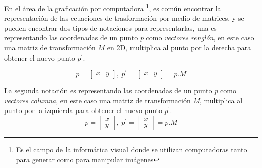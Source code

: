 En el área de la graficación por computadora \footnote{Es el campo de la informática visual donde se utilizan computadoras tanto para generar como para manipular imágenes}, es común encontrar la representación de las ecuaciones de trasformación por medio de matrices, y se pueden encontrar dos tipos de notaciones para representarlas, una es representando las coordenadas de un punto $p$ como \textit{vectores renglón}, en este caso una matriz de transformación $M$ en 2D, multiplica al punto por la derecha para obtener el nuevo punto $p^\prime$. \citep{Matias2007}

\begin{equation}
   p = \begin{bmatrix}
       x & y         
     \end{bmatrix}, \ p^{\prime} = \begin{bmatrix}
       x & y         
     \end{bmatrix}= p.M  
\end{equation} 
     
La segunda notación es representando las coordenadas de un punto \textit{p} como \textit{vectores columna}, en este caso una matriz de transformación \textit{M}, multiplica al punto por la izquierda para obtener el nuevo punto $p^{\prime}$.
\begin{equation}
     p = \begin{bmatrix}
       x \\ y         
     \end{bmatrix}, \ p^{\prime} = \begin{bmatrix}
       x \\ y           
     \end{bmatrix}= p.M 
\end{equation}
     

